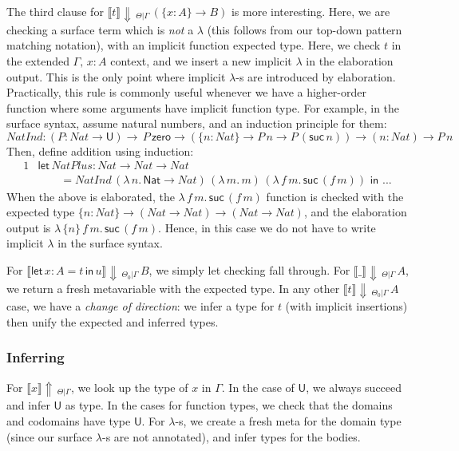 \documentclass[acmsmall,review,anonymous,prologue,dvipsnames]{acmart}\settopmatter{printfolios=true,printccs=false,printacmref=false}
\newcommand{\slet}{\boldsymbol{\mathsf{let}}}
\renewcommand{\sin}{\boldsymbol{\mathsf{in}}}
\renewcommand{\U}{\mathsf{U}}
\newcommand{\echeck}[4]{\llbracket#1\rrbracket\!\Downarrow\,_{#2|#3}\,#4}
\newcommand{\einfer}[3]{\llbracket#1\rrbracket\!\Uparrow\,_{#2|#3}}
\newcommand{\Nat}{\mathsf{Nat}}
\newcommand{\zero}{\mathsf{zero}}
\newcommand{\suc}{\mathsf{suc}}
\theoremstyle{remark}
\begin{document}
The third clause for $\echeck{t}{\Theta}{\Gamma}{(\{x : A\}\to B)}$ is more
interesting. Here, we are checking a surface term which is \emph{not} a
$\lambda$ (this follows from our top-down pattern matching notation), with an
implicit function expected type. Here, we check $t$ in the extended $\Gamma,\,x
: A$ context, and we insert a new implicit $\lambda$ in the elaboration
output. This is the only point where implicit $\lambda$-s are introduced by
elaboration. Practically, this rule is commonly useful whenever we have a
higher-order function where some arguments have implicit function type. For
example, in the surface syntax, assume natural numbers, and an induction
principle for them:
\[
NatInd : (P : Nat \to \U)\to \,P\,\zero \to (\{n : Nat\}\to P\,n \to
         P\,(\suc\,n)) \to (n : Nat) \to P\,n
\]
Then, define addition using induction:
\begin{alignat*}{1}
& \slet\, NatPlus : Nat \to Nat \to Nat\\
& \qquad = NatInd\,(\lambda\,n.\,\Nat\to Nat)\,(\lambda\,m.\,m)\,
                        (\lambda\,f\,m.\,\suc\,(f\,m))\,\,\sin\,\,...
\end{alignat*}
When the above is elaborated, the $\lambda\,f\,m.\,\suc\,(f\,m)$ function is
checked with the expected type $\{n : Nat\}\to (Nat \to Nat) \to (Nat \to Nat)$,
and the elaboration output is $\lambda\,\{n\}\,f\,m.\,\suc\,(f\,m)$.  Hence, in
this case we do not have to write implicit $\lambda$ in the surface syntax.

For $\echeck{\slet\,x:A=t\,\sin\,u}{\Theta_0}{\Gamma}{B}$, we simply let
checking fall through. For $\echeck{\_}{\Theta}{\Gamma}{A}$, we return a fresh
metavariable with the expected type. In any other
$\echeck{t}{\Theta_0}{\Gamma}{A}$ case, we have a \emph{change of direction}: we
infer a type for $t$ (with implicit insertions) then unify the expected and
inferred types.

\subsubsection{Inferring}

For $\einfer{x}{\Theta}{\Gamma}$, we look up the type of $x$ in $\Gamma$. In the
case of $\U$, we always succeed and infer $\U$ as type. In the cases for
function types, we check that the domains and codomains have type $\U$.  For
$\lambda$-s, we create a fresh meta for the domain type (since our surface
$\lambda$-s are not annotated), and infer types for the bodies.
\end{document}
